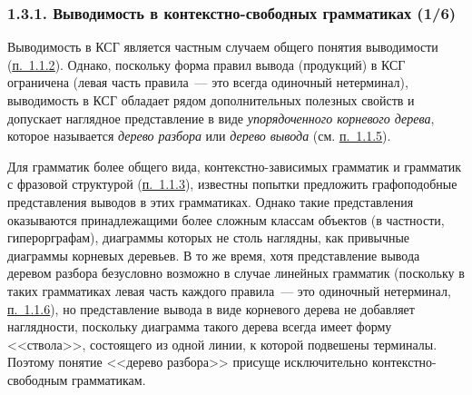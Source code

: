 \documentclass[mathserif,12pt,aspectratio=169]{beamer}
\def\emразделенной{\em разделенной}
\renewcommand{\index}[1]{}
\def\em#1{\it\color{blue}#1}
\def\odmkey#1#2{{\it\color{red} #1}\index{#2}}
\def\DMref#1#2{{\color{blue}\underline{\hyperlink{#2}{#1}}}}
\begin{document}
\begin{frame}
\frametitle{1.3.1. Выводимость в контекстно-свободных грамматиках (1/6)}

Выводимость в КСГ является частным случаем общего
понятия выводимости (\DMref{п.~1.1.2}{1.1.2.}). 
Однако, поскольку форма правил вывода (продукций)
в КСГ ограничена (левая часть правила~--- это всегда одиночный
нетерминал), выводимость в КСГ обладает 
рядом дополнительных полезных свойств и допускает наглядное 
представление в виде {\em упорядоченного корневого дерева},
которое называется  \odmkey{дерево разбора}{Дерево!разбора} 
или  \odmkey{дерево вывода}{Дерево!вывода} 
(см. \DMref{п.~1.1.5}{1.1.5.}).


\begin{remark}
Для грамматик более общего вида, контекстно-зависимых
грамматик и грамматик с фразовой структурой (\DMref{п.~1.1.3}{1.1.3.}), 
известны попытки предложить графоподобные представления
выводов в этих грамматиках.
Однако такие представления оказываются
принадлежащими более сложным классам объектов
(в частности, гиперорграфам), 
диаграммы которых не столь наглядны, как привычные
диаграммы корневых деревьев.
В то же время, хотя представление вывода деревом разбора
безусловно возможно в случае линейных грамматик
(поскольку в таких грамматиках левая 
часть каждого правила~---  
это одиночный нетерминал, \DMref{п.~1.1.6}{1.1.6.}),
но представление вывода в виде корневого дерева
не добавляет наглядности, поскольку диаграмма 
такого дерева всегда имеет форму 
<<ствола>>, состоящего из одной линии, к которой
подвешены терминалы. Поэтому понятие <<дерево разбора>> присуще исключительно
контекстно-свободным грамматикам.   
\end{remark}

\end{frame}
\end{document}
